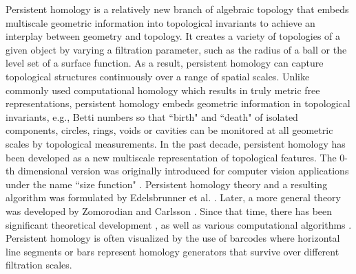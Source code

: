 \documentclass[10pt]{article}
\begin{document}
Persistent homology   is a relatively new branch of algebraic topology that   embeds multiscale geometric information into topological invariants to achieve an  interplay between geometry and topology. It creates a variety of topologies of a given object by varying a  filtration parameter, such as the radius of a ball or the level set of a surface function. 
As a result, persistent homology can capture topological structures continuously over a range of spatial  scales. Unlike commonly used computational homology which results in  truly metric free  representations, persistent homology embeds geometric information in topological invariants, e.g., Betti numbers %
so that ``birth"  and ``death" of  isolated components, circles, rings,  voids or cavities can be monitored at all geometric scales by topological measurements.
%
In the past decade, persistent homology has been developed as a new multiscale representation of topological features.  %
The 0-th dimensional version was originally introduced for computer vision applications under the name ``size function" \cite{Fro90, Frosini:1999,Robins:1999}.  
Persistent homology theory and a resulting algorithm was formulated  by Edelsbrunner et al. \cite{Edelsbrunner:2002}. Later, a more general theory was developed by Zomorodian and Carlsson \cite{Zomorodian:2005}. 
Since that time, there has been significant theoretical development \cite{BH11,CEH07,CEH09,CEHM09,CCG09,CGOS11,Carlsson:2009theory,CSM09,SMV11,zigzag}, as well as various computational algorithms \cite{OS13,DFW14,Mischaikow:2013,javaPlex,Perseus, Dipha}. 
Persistent homology is often visualized by the use of barcodes \cite{CZOG05,Ghrist:2008} where horizontal line segments or bars represent homology generators that survive over different filtration scales.
\end{document}
